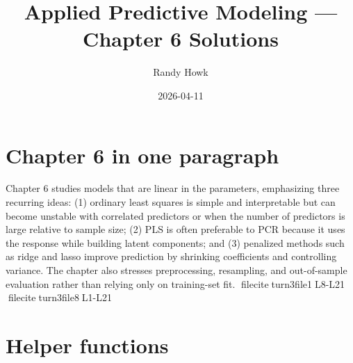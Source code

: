 \documentclass[
  11pt,
]{article}
\title{Applied Predictive Modeling --- Chapter 6 Solutions}
\author{Randy Howk}
\date{2026-04-11}
\begin{document}
\maketitle

{
\setcounter{tocdepth}{2}
\tableofcontents
}
\section{Chapter 6 in one paragraph}\label{chapter-6-in-one-paragraph}

Chapter 6 studies models that are linear in the parameters, emphasizing
three recurring ideas: (1) ordinary least squares is simple and
interpretable but can become unstable with correlated predictors or when
the number of predictors is large relative to sample size; (2) PLS is
often preferable to PCR because it uses the response while building
latent components; and (3) penalized methods such as ridge and lasso
improve prediction by shrinking coefficients and controlling variance.
The chapter also stresses preprocessing, resampling, and out-of-sample
evaluation rather than relying only on training-set fit.
fileciteturn3file1L8-L21 fileciteturn3file8L1-L21

\section{Helper functions}\label{helper-functions}
\end{document}
